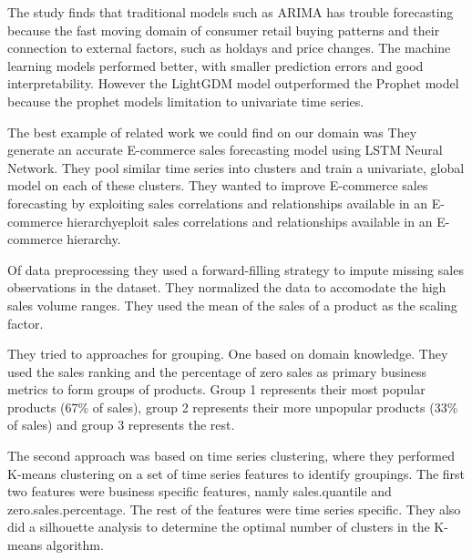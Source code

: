 The study finds that traditional models such as ARIMA has trouble forecasting
because the fast moving domain of consumer retail buying patterns and 
their connection to external factors, such as holdays and price changes.
The machine learning models performed better, with smaller prediction errors
and good interpretability.
However the LightGDM model outperformed the Prophet model because the prophet
models limitation to univariate time series.


%
%

The best example of related work we could find on our domain was 
\cite{Bandara2019}
They generate an accurate E-commerce sales forecasting model using LSTM  Neural Network.
They pool similar time series into clusters and train a univariate, global model on each of these 
clusters.
They wanted to improve E-commerce sales forecasting by 
exploiting sales correlations and relationships available in an E-commerce hierarchyeploit sales correlations and relationships available in an E-commerce hierarchy.

Of data preprocessing they used a forward-filling strategy to impute missing sales
observations in the dataset. They normalized the data to accomodate the high
sales volume ranges. They used the mean of the sales of a product as the scaling factor.

They tried to approaches for grouping. One based on domain knowledge.
They used the sales ranking and the percentage of zero sales as primary business metrics
to form groups of products. Group 1 represents their most popular products (67\% of sales), group 2 represents
their more unpopular products (33\% of sales) and group 3 represents the rest.

The second approach was based on time series clustering, where they performed K-means
clustering on a set of time series features to identify groupings. The first two features
were business specific features, namly sales.quantile and zero.sales.percentage.
The rest of the features were time series specific.
They also did a silhouette analysis to determine the optimal number of clusters in the K-means algorithm.

